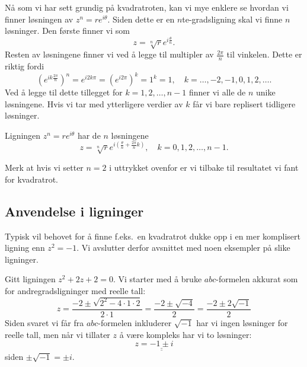 \documentclass[a4paper,norsk,12pt]{article}
\newcommand{\ans}[1]{\underline{\underline{#1}}}
\newcounter{exa}
\begin{document}
Nå som vi har sett grundig på kvadratroten, kan vi mye enklere se hvordan vi finner løsningen av $z^n = re^{i\theta}$. Siden dette er en $n$te-gradsligning skal vi finne $n$ løsninger. Den første finner vi som
\begin{displaymath}
	z = \sqrt[n]{r}e^{i\frac{\theta}{n}}.
\end{displaymath}
Resten av løsningene finner vi ved å legge til multipler av $\frac{2\pi}{n}$ til vinkelen. Dette er riktig fordi
\begin{displaymath}
	\left(e^{ik\frac{2\pi}{n}}\right)^n = e^{i2k\pi} = (e^{i2\pi})^k = 1^k = 1, \quad k =  \ldots, -2, -1, 0, 1, 2, \ldots.
\end{displaymath}
Ved å legge til dette tillegget for $k=1, 2, \ldots, n-1$ finner vi alle de $n$ unike løsningene. Hvis vi tar med ytterligere verdier av $k$ får vi bare replisert tidligere løsninger.
\begin{tsummary}
	Ligningen $z^n = re^{i\theta}$ har de $n$ løsningene
	\begin{displaymath}
		z = \sqrt[n]{r}e^{i\left(\frac{\theta}{n} + \frac{2\pi}{n}k\right)}, \quad k=0,1,2,\ldots, n-1.
	\end{displaymath}
\end{tsummary}
\noindent
Merk at hvis vi setter $n=2$ i uttrykket ovenfor er vi tilbake til resultatet vi fant for kvadratrot.

\subsection{Anvendelse i ligninger}
Typisk vil behovet for å finne f.eks.~en kvadratrot dukke opp i en mer komplisert ligning enn $z^2=-1$. Vi avslutter derfor avsnittet med noen eksempler på slike ligninger.
\begin{texample}
Gitt ligningen $z^2 + 2z + 2 = 0$. Vi starter med å bruke $abc$-formelen akkurat som for andregradsligninger med reelle tall:
\begin{displaymath}
	z = \frac{-2\pm\sqrt{2^2-4\cdot1\cdot2}}{2\cdot 1}= \frac{-2\pm\sqrt{-4}}{2} = \frac{-2\pm2\sqrt{-1}}{2}
\end{displaymath}
Siden svaret vi får fra $abc$-formelen inkluderer $\sqrt{-1}$ har vi ingen løsninger for reelle tall, men når vi tillater $z$ å være kompleks har vi to løsninger:
\begin{displaymath}
	z= \ans{-1 \pm i}
\end{displaymath}
siden $\pm\sqrt{-1} = \pm i$.
\end{texample}
\end{document}
